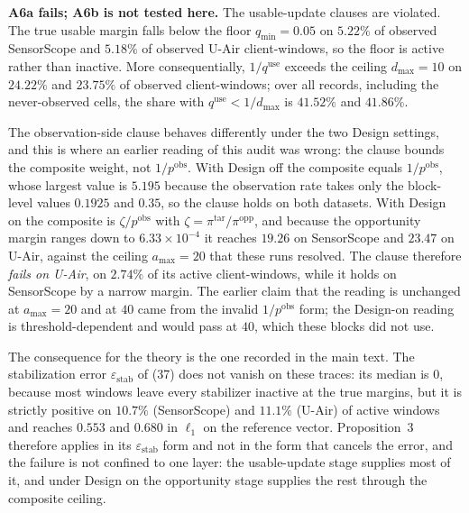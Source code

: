 \noindent\textbf{A6a fails; A6b is not tested here.}  The usable-update
clauses are violated.  The
true usable margin falls below the floor $q_{\min}=0.05$ on $5.22\%$ of
observed SensorScope and $5.18\%$ of observed U-Air client-windows, so the
floor is active rather than inactive.  More consequentially,
$1/q^{\mathrm{use}}$ exceeds the ceiling $d_{\max}=10$ on $24.22\%$ and
$23.75\%$ of observed client-windows; over all records, including the
never-observed cells, the share with $q^{\mathrm{use}}<1/d_{\max}$ is
$41.52\%$ and $41.86\%$.

The observation-side clause behaves differently under the two Design settings,
and this is where an earlier reading of this audit was wrong: the clause bounds
the composite weight, not $1/p^{\mathrm{obs}}$.  With Design off the composite
equals $1/p^{\mathrm{obs}}$, whose largest value is $5.195$ because the
observation rate takes only the block-level values $0.1925$ and $0.35$, so the
clause holds on both datasets.  With Design on the composite is
$\zeta/p^{\mathrm{obs}}$ with $\zeta=\pi^{\mathrm{tar}}/\pi^{\mathrm{opp}}$, and
because the opportunity margin ranges down to $6.33\times10^{-4}$ it reaches
$19.26$ on SensorScope and $23.47$ on U-Air, against the ceiling
$a_{\max}=20$ that these runs resolved.  The clause therefore \emph{fails on
U-Air}, on $2.74\%$ of its active client-windows, while it holds on
SensorScope by a narrow margin.  The earlier claim that the reading is
unchanged at $a_{\max}=20$ and at $40$ came from the invalid
$1/p^{\mathrm{obs}}$ form; the Design-on reading is threshold-dependent and
would pass at $40$, which these blocks did not use.

The consequence for the theory is the one recorded in the main text.  The
stabilization error $\varepsilon_{\mathrm{stab}}$ of (37) does not vanish on
these traces: its median is $0$, because most windows leave every stabilizer
inactive at the true margins, but it is strictly positive on $10.7\%$
(SensorScope) and $11.1\%$ (U-Air) of active windows and reaches $0.553$ and
$0.680$ in $\ell_1$ on the reference vector.  Proposition~3 therefore applies
in its $\varepsilon_{\mathrm{stab}}$ form and not in the form that cancels the
error, and the failure is not confined to one layer: the usable-update stage
supplies most of it, and under Design on the opportunity stage supplies the
rest through the composite ceiling.

